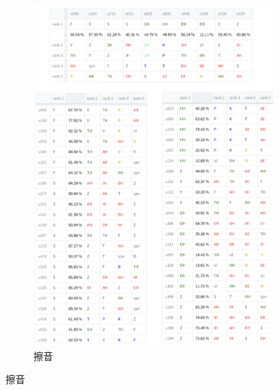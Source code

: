         {
        \newcommand{\tempwidth}[0]{0.8\linewidth}
        \begin{figure}
        \ContinuedFloat
             \centering
             \begin{subfigure}{\textwidth}
                 \centering
                 \includegraphics[width=\tempwidth]{figures/ch4figs/fri_phn.png}
                 \caption{擦音}
                 \label{fig:hub-u050-ap0500-friobs}
             \end{subfigure}


\end{figure}}
